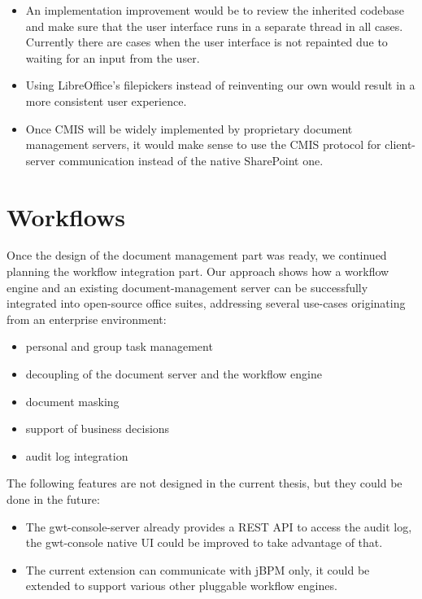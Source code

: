 \begin{itemize}
\item An implementation improvement would be to review the inherited codebase
and make sure that the user interface runs in a separate thread in all cases.
Currently there are cases when the user interface is not repainted due to
waiting for an input from the user.
\item Using LibreOffice's filepickers instead of reinventing our own would
result in a more consistent user experience.
\item Once CMIS will be widely implemented by proprietary document management
servers, it would make sense to use the CMIS protocol for client-server
communication instead of the native SharePoint one.
\end{itemize}

\section{Workflows}

Once the design of the document management part was ready, we continued
planning the workflow integration part. Our approach shows how a workflow
engine and an existing document-management server can be successfully
integrated into open-source office suites, addressing several use-cases
originating from an enterprise environment:

\begin{itemize}
\item personal and group task management
\item decoupling of the document server and the workflow engine
\item document masking
\item support of business decisions
\item audit log integration
\end{itemize}

The following features are not designed in the current thesis, but they could
be done in the future:

\begin{itemize}
\item The gwt-console-server already provides a REST API to access the audit log,
the gwt-console native UI could be improved to take advantage of that.
\item The current extension can communicate with jBPM only, it could be
extended to support various other pluggable workflow engines.
\end{itemize}

